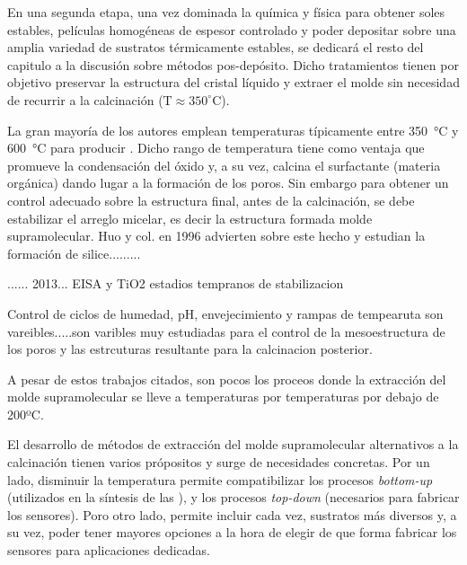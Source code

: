 	En una segunda etapa, una vez dominada la química y física para obtener soles estables, películas homogéneas de espesor controlado y poder depositar sobre una amplia variedad de sustratos térmicamente estables, se dedicará el resto del capitulo a la discusión sobre métodos pos-depósito. Dicho tratamientos tienen por objetivo preservar la estructura del cristal líquido y extraer el molde sin necesidad de recurrir a la calcinación ($\text{T}\approx 350^\circ \text{C}$).

	La gran mayoría de los autores emplean temperaturas típicamente entre \SI{350}{\celsius} y \SI{600}{\celsius} para producir \pdm. Dicho rango de temperatura tiene como ventaja que promueve la condensación del óxido y, a su vez, calcina el surfactante (materia orgánica) dando lugar a la formación de los poros.\cite{Kresge1992,Beck1992,DiRenzo1997}  Sin embargo para obtener un control adecuado sobre la estructura final, antes de la calcinación, se debe estabilizar el arreglo micelar, es decir la estructura formada molde supramolecular. Huo y col.\cite{Huo1996} en 1996 advierten sobre este hecho y estudian la formación de silice......... 

	...... 2013... EISA y TiO2 estadios tempranos de stabilizacion

	Control de ciclos de humedad, pH, envejecimiento y rampas de tempearuta son vareibles.....son varibles muy estudiadas para el control de la mesoestructura de los poros y las estrcuturas resultante para la calcinacion posterior. 

	A pesar de estos trabajos citados, son pocos los proceos donde la extracción del molde supramolecular se lleve a temperaturas por temperaturas por debajo de 200ºC. 




	El desarrollo de métodos de extracción del molde supramolecular alternativos a la calcinación tienen varios própositos y surge de necesidades concretas. Por un lado, disminuir la temperatura permite compatibilizar los procesos \textit{bottom-up} (utilizados en la síntesis de las \pdm), y los procesos \textit{top-down} (necesarios para fabricar los sensores). Poro otro lado, permite incluir cada vez, sustratos más diversos y, a su vez, poder tener mayores opciones a la hora de elegir de que forma fabricar los sensores para aplicaciones dedicadas\cite{Doshi2000a,Wagner2013,Innocenzi2013,Soler-Illia2002a}.


